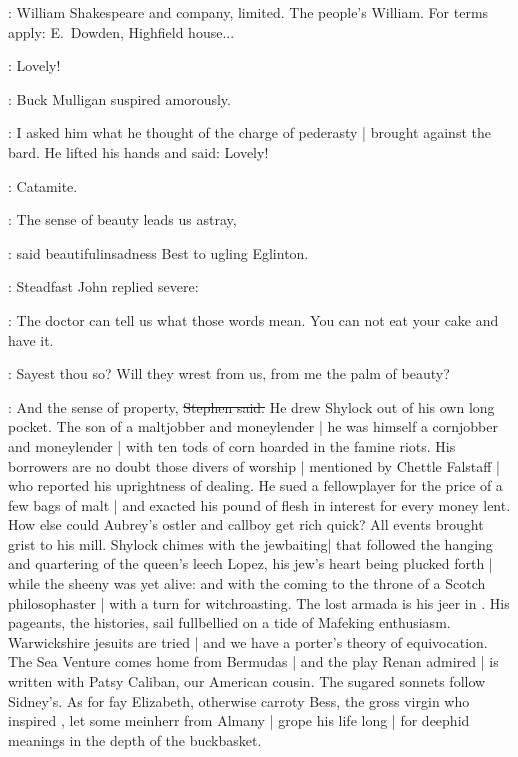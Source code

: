 \StephenInt:
William Shakespeare and company, limited.
The people's William.
For terms apply:
E.~Dowden,
Highfield house...

\mulligan:
Lovely!

:
Buck Mulligan suspired amorously.

\mulligan:
I asked him what he thought
of the charge of pederasty |
brought against the bard.
He lifted his hands and said:
Lovely!

\StephenInt:
Catamite.

\best:
The sense of beauty leads us astray,

:
said beautifulinsadness Best to ugling Eglinton.

:
Steadfast John replied severe:

\eglinton:
The doctor can tell us what those words mean.
You can not eat your cake and have it.

\StephenInt:
Sayest thou so?
Will they wrest from us,
from me the palm of beauty?

\Stephen:
And the sense of property,
\sout{Stephen said.}
He drew Shylock out of his own long pocket.
The son of a maltjobber and moneylender |
he was himself a cornjobber and moneylender |
with ten tods of corn hoarded in the famine riots.
His borrowers are no doubt those divers of worship |
mentioned by Chettle Falstaff |
who reported his uprightness of dealing.
He sued a fellowplayer for the price of a few bags of malt |
and exacted his pound of flesh in interest for every money lent.
How else could Aubrey's ostler and callboy get rich quick?
All events brought grist to his mill.
Shylock chimes with the jewbaiting|
that followed the hanging and quartering of the queen's leech Lopez,
his jew's heart being plucked forth |
while the sheeny was yet alive:
 and 
with the coming to the throne of a Scotch philosophaster |
with a turn for witchroasting.
The lost armada is his jeer in .
His pageants, the histories,
sail fullbellied on a tide of Mafeking enthusiasm.
Warwickshire jesuits are tried |
and we have a porter's theory of equivocation.
The Sea Venture comes home from Bermudas |
and the play Renan admired |
is written with Patsy Caliban,
our American cousin.
The sugared sonnets follow Sidney's.
As for fay Elizabeth,
otherwise carroty Bess,
the gross virgin who inspired ,
let some meinherr from Almany |
grope his life long |
for deephid meanings
in the depth of the buckbasket.

